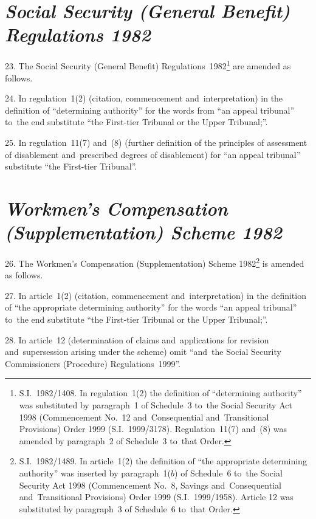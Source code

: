 \documentclass[12pt,a4paper]{article}
\begin{document}
\section*{\itshape Social Security (General Benefit) Regulations 1982}

23.  The Social Security (General Benefit) Regulations~1982\footnote{S.I.~1982/1408. In regulation~1(2) the definition of “determining authority” was substituted by paragraph~1 of Schedule~3 to~the Social Security Act 1998 (Commencement No.~12 and~Consequential and~Transitional Provisions) Order 1999 (S.I.~1999/3178). Regulation~11(7) and~(8) was amended by paragraph~2 of Schedule~3 to~that Order.} are amended as follows.

\medskip

24.  In regulation~1(2) (citation, commencement and~interpretation) in the definition of “determining authority” for the words from “an appeal tribunal” to~the end substitute “the First-tier Tribunal or the Upper Tribunal;”.

\medskip

25.  In regulation~11(7) and~(8) (further definition of the principles of assessment of disablement and~prescribed degrees of disablement) for “an appeal tribunal” substitute “the First-tier Tribunal”.

\section*{\itshape Workmen’s Compensation (Supplementation) Scheme 1982}

26.  The Workmen’s Compensation (Supplementation) Scheme 1982\footnote{S.I.~1982/1489. In article~1(2) the definition of “the appropriate determining authority” was inserted by paragraph~1($b$) of Schedule~6 to~the Social Security Act 1998 (Commencement No.~8, Savings and~Consequential and~Transitional Provisions) Order 1999 (S.I.~1999/1958). Article 12 was substituted by paragraph~3 of Schedule~6 to~that Order.} is amended as follows.

\medskip

27.  In article~1(2) (citation, commencement and~interpretation) in the definition of “the appropriate determining authority” for the words “an appeal tribunal” to~the end substitute “the First-tier Tribunal or the Upper Tribunal;”.

\medskip

28.  In article~12 (determination of claims and~applications for revision and~supersession arising under the scheme) omit “and~the Social Security Commissioners (Procedure) Regulations~1999”.
\end{document}
